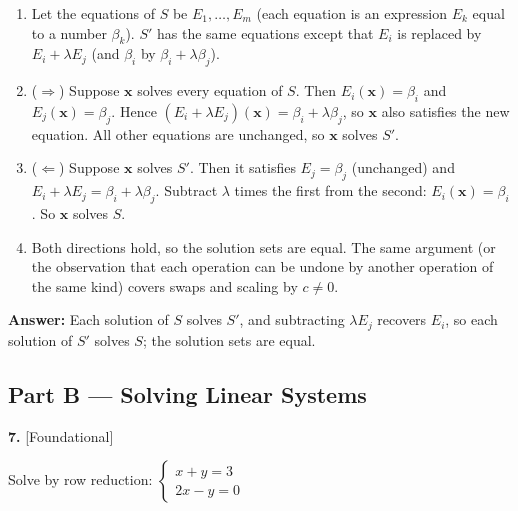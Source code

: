 \documentclass[11pt]{article}
\begin{document}
\begin{tcolorbox}[breakable,colback=ans,colframe=ansb,boxrule=0.5pt,left=4pt,right=4pt,top=2pt,bottom=2pt]\begin{enumerate}[leftmargin=2.2em,itemsep=1pt,topsep=1pt,label=\textbf{Step \arabic*.}]\item Let the equations of $S$ be $E_1,\dots,E_m$ (each equation is an expression $E_k$ equal to a number $\beta_k$). $S'$ has the same equations except that $E_i$ is replaced by $E_i+\lambda E_j$ (and $\beta_i$ by $\beta_i+\lambda\beta_j$).
\item ($\Rightarrow$) Suppose $\mathbf x$ solves every equation of $S$. Then $E_i(\mathbf x)=\beta_i$ and $E_j(\mathbf x)=\beta_j$. Hence $(E_i+\lambda E_j)(\mathbf x)=\beta_i+\lambda\beta_j$, so $\mathbf x$ also satisfies the new equation. All other equations are unchanged, so $\mathbf x$ solves $S'$.
\item ($\Leftarrow$) Suppose $\mathbf x$ solves $S'$. Then it satisfies $E_j=\beta_j$ (unchanged) and $E_i+\lambda E_j=\beta_i+\lambda\beta_j$. Subtract $\lambda$ times the first from the second: $E_i(\mathbf x)=\beta_i$. So $\mathbf x$ solves $S$.
\item Both directions hold, so the solution sets are equal. The same argument (or the observation that each operation can be undone by another operation of the same kind) covers swaps and scaling by $c\neq0$.
\end{enumerate}\textbf{Answer:} Each solution of $S$ solves $S'$, and subtracting $\lambda E_j$ recovers $E_i$, so each solution of $S'$ solves $S$; the solution sets are equal.\end{tcolorbox}
\par\vspace{2pt}
\subsection*{\normalsize\color{ink} Part B --- Solving Linear Systems}
\begin{minipage}{\linewidth}\textbf{7.} \hfill{\scriptsize\color{ink}[Foundational]}\par\nopagebreak Solve by row reduction: $\begin{cases}x+y=3\\ 2x-y=0\end{cases}$
\end{minipage}\par\nopagebreak
\end{document}
